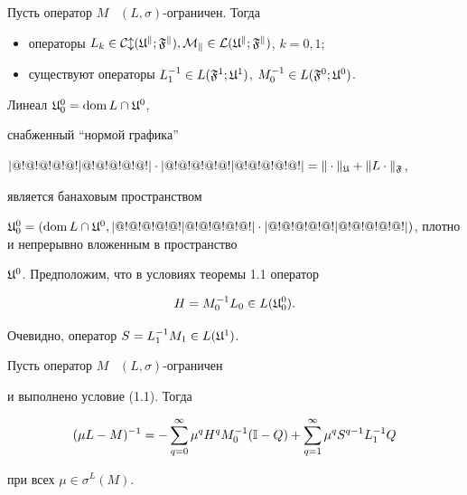 \begin{thms}


Пусть оператор $M$ \ $(L,\sigma)$-ограничен. Тогда


\begin{itemize}


\item[(i)] операторы $L_{k}\in\Cl(\frak U^{k};\frak F^{k}),


M_{k}\in L(\frak U^{k};\frak F^{k})$, $k=0,1;$


\item[(ii)] существуют операторы $L^{-1}_{1}\in L(\frak F^{1}; \frak


U^{1})$, $M^{-1}_{0}\in L(\frak F^{0};\frak U^{0})$.


\end{itemize}


\end{thms}





Линеал $\frak U^{0}_{0}=\operatorname{dom} L\cap\frak U^{0}$,


снабженный ``нормой графика''


$|@!@!@!@!@!|@!@!@!@!@!|\cdot|@!@!@!@!@!|@!@!@!@!@!|=\|\cdot\|_{\frak U}+\|L\cdot\|_{\frak F}$,


является банаховым пространством


$\frak U^{0}_{0}=(\dom L\cap\frak


U^{0},\tri\cdot\tri)$, плотно и непрерывно вложенным в пространство


$\frak U^{0}$. Предположим, что в условиях теоремы 1.1 оператор


\begin{equation}


H=M^{-1}_{0}L_{0}\in L(\frak U^{0}_{0}).


\end{equation}





Очевидно, оператор $S=L^{-1}_{1}M_{1}\in L(\frak U^{1})$.








\begin{cors}


Пусть оператор $M$ \ $(L,\sigma)$-ограничен


и выполнено условие (1.1). Тогда


$$


(\mu L-M)^{-1}=-\sum_{q=0}^{\infty}\mu^{q}H^{q}M^{-1}_{0}(\Bbb I -Q)+


\sum_{q=1}^{\infty}\mu^{q}S^{q-1}L^{-1}_{1}Q


$$


при всех $\mu\in\sigma^{L}(M)$.


\end{cors}








